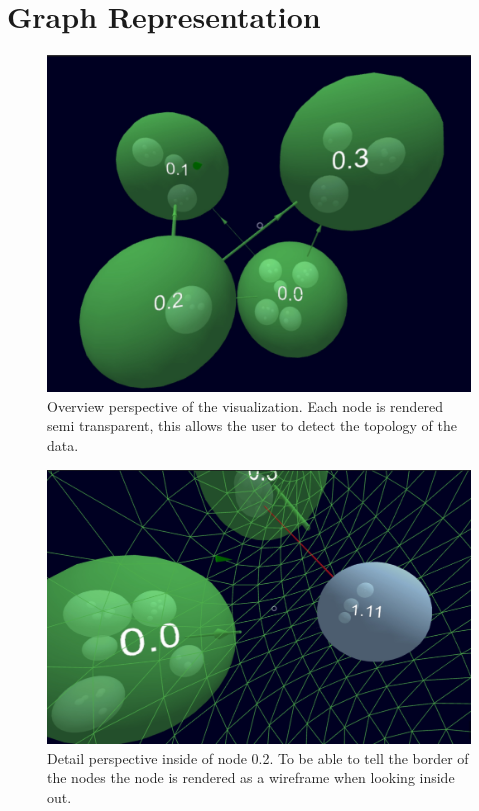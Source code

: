 \section{Graph Representation}
\label{chap:ps-graphRepresentation}
\begin{figure}[!htb]
    \centering
    \includegraphics[width=1\textwidth]{graphics/screenshotNesting.jpg}
    \caption[Screenshot of the visualization.]{Overview perspective of the visualization. Each node is rendered semi transparent, this allows the user to detect the topology of the data.}
    \label{fig:ps_nestedLayout}
\end{figure}
\begin{figure}[!htb]
    \centering
    \includegraphics[width=1\textwidth]{graphics/screenshotNestingAndWireframe.jpg}
    \caption[Screenshot of the visualization.]{Detail perspective inside of node 0.2. To be able to tell the border of the nodes the node is rendered as a wireframe when looking inside out.}
    \label{fig:ps_wireframe}
\end{figure}
